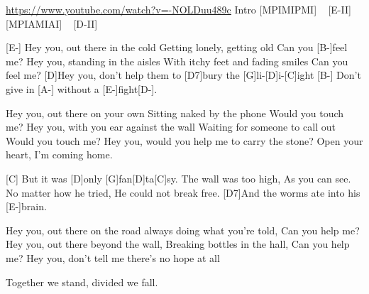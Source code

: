 \url{https://www.youtube.com/watch?v=-NOLDuu489c}
Intro
[MPIMIPMI] ~ [E-II] ~ [MPIAMIAI] ~ [D-II]

[E-]
Hey you, out there in the cold
Getting lonely, getting old
Can you [B-]feel me?
Hey you, standing in the aisles
With itchy feet and fading smiles
Can you feel me?
[D]Hey you, don’t help them to [D7]bury the [G]li-[D]i-[C]ight
[B-] Don't give in [A-] without a [E-]fight[D-].

Hey you, out there on your own
Sitting naked by the phone
Would you touch me?
Hey you, with you ear against the wall
Waiting for someone to call out
Would you touch me?
Hey you, would you help me to carry the stone?
Open your heart, I'm coming home.


[C] But it was [D]only [G]fan[D]ta[C]sy.
The wall was too high,
As you can see.
No matter how he tried,
He could not break free.
[D7]And the worms ate into his [E-]brain.

Hey you, out there on the road
always doing what you're told,
Can you help me?
Hey you, out there beyond the wall,
Breaking bottles in the hall,
Can you help me?
Hey you, don't tell me there's no hope at all

Together we stand, divided we fall.
